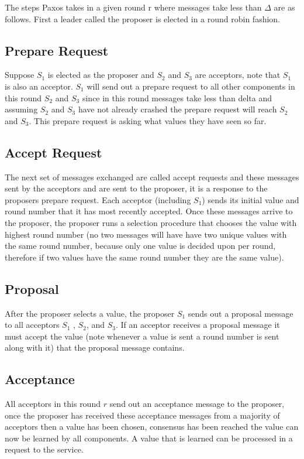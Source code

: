 \documentclass[conference]{IEEEtran}
\begin{document}
The steps Paxos takes in a given round r where messages take less than $\Delta$ are as follows. First a leader called the proposer  is elected in a round robin fashion. 

\subsection{Prepare Request}
Suppose \(S_1\) is elected as the proposer and \(S_2\) and \(S_3\) are acceptors, note that \(S_1\) is also an acceptor. \(S_1\) will send out a prepare request to all other components in this round \(S_2\) and \(S_3\) since in this round messages take less than delta and assuming \(S_2\) and \(S_3\) have not already crashed the prepare request will reach \(S_2\) and \(S_3\). This prepare request is asking what values they have seen so far. 

\subsection{Accept Request}
The next set of messages exchanged are called accept requests and these messages sent by the acceptors and are sent to the proposer, it is a response to the proposers prepare request. Each acceptor (including \(S_1\)) sends its initial value and round number that it has most recently accepted. Once these messages arrive to the proposer, the proposer runs a selection procedure that chooses the value with highest round number (no two messages will have have two unique values with the same round number, because only one value is decided upon per round, therefore if two values have the same round number they are the same value). 

\subsection{Proposal}
After the proposer selects a value, the proposer \(S_1\) sends out a proposal message to all acceptors \(S_1\) , \(S_2\), and \(S_3\). If an acceptor receives a proposal message it must accept the value (note whenever a value is sent a round number is sent along with it) that the proposal message contains. 

\subsection{Acceptance}
All acceptors in this round \(r\) send out an acceptance message to the proposer, once the proposer has received these acceptance messages from a majority of acceptors then a value has been chosen, consensus has been reached  the value can now be learned by all components. A value that is learned can be processed in a request to the service. 
\end{document}
